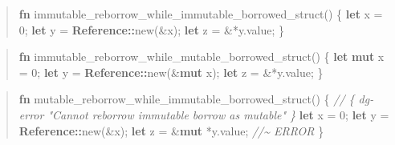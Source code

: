 \documentclass[
  11pt,
  twoside]{report}
\newenvironment{Shaded}{}{}
\newcommand{\CommentTok}[1]{\textit{#1}}
\newcommand{\DecValTok}[1]{#1}
\newcommand{\KeywordTok}[1]{\textbf{#1}}
\newcommand{\NormalTok}[1]{#1}
\newcommand{\OperatorTok}[1]{#1}
\newcommand{\PreprocessorTok}[1]{\textbf{#1}}
\begin{document}
\begin{quote}
\begin{Shaded}
\begin{Highlighting}[]
\KeywordTok{fn}\NormalTok{ immutable\_reborrow\_while\_immutable\_borrowed\_struct() }\OperatorTok{\{}
    \KeywordTok{let}\NormalTok{ x }\OperatorTok{=} \DecValTok{0}\OperatorTok{;}
    \KeywordTok{let}\NormalTok{ y }\OperatorTok{=} \PreprocessorTok{Reference::}\NormalTok{new(}\OperatorTok{\&}\NormalTok{x)}\OperatorTok{;}
    \KeywordTok{let}\NormalTok{ z }\OperatorTok{=} \OperatorTok{\&*}\NormalTok{y}\OperatorTok{.}\NormalTok{value}\OperatorTok{;}
\OperatorTok{\}}
\end{Highlighting}
\end{Shaded}
\end{quote}

\begin{quote}
\begin{Shaded}
\begin{Highlighting}[]
\KeywordTok{fn}\NormalTok{ immutable\_reborrow\_while\_mutable\_borrowed\_struct() }\OperatorTok{\{}
    \KeywordTok{let} \KeywordTok{mut}\NormalTok{ x }\OperatorTok{=} \DecValTok{0}\OperatorTok{;}
    \KeywordTok{let}\NormalTok{ y }\OperatorTok{=} \PreprocessorTok{Reference::}\NormalTok{new(}\OperatorTok{\&}\KeywordTok{mut}\NormalTok{ x)}\OperatorTok{;}
    \KeywordTok{let}\NormalTok{ z }\OperatorTok{=} \OperatorTok{\&*}\NormalTok{y}\OperatorTok{.}\NormalTok{value}\OperatorTok{;}
\OperatorTok{\}}
\end{Highlighting}
\end{Shaded}
\end{quote}

\begin{quote}
\begin{Shaded}
\begin{Highlighting}[]
\KeywordTok{fn}\NormalTok{ mutable\_reborrow\_while\_immutable\_borrowed\_struct() }\OperatorTok{\{}
    \CommentTok{// \{ dg{-}error "Cannot reborrow immutable borrow as mutable" \}}
    \KeywordTok{let}\NormalTok{ x }\OperatorTok{=} \DecValTok{0}\OperatorTok{;}
    \KeywordTok{let}\NormalTok{ y }\OperatorTok{=} \PreprocessorTok{Reference::}\NormalTok{new(}\OperatorTok{\&}\NormalTok{x)}\OperatorTok{;}
    \KeywordTok{let}\NormalTok{ z }\OperatorTok{=} \OperatorTok{\&}\KeywordTok{mut} \OperatorTok{*}\NormalTok{y}\OperatorTok{.}\NormalTok{value}\OperatorTok{;} \CommentTok{//\textasciitilde{} ERROR}
\OperatorTok{\}}
\end{Highlighting}
\end{Shaded}
\end{quote}
\end{document}
